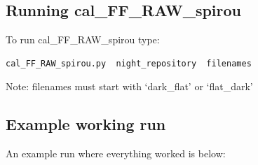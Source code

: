 \subsection{Running cal\_FF\_RAW\_spirou}

To run cal\_FF\_RAW\_spirou type:
\begin{lstlisting}[language=bash, style=bashstyle]
cal_FF_RAW_spirou.py  night_repository  filenames
\end{lstlisting}

\noindent Note: filenames must start with `dark\_flat' or `flat\_dark'

\subsection{Example working run}

An example run where everything worked is below:

